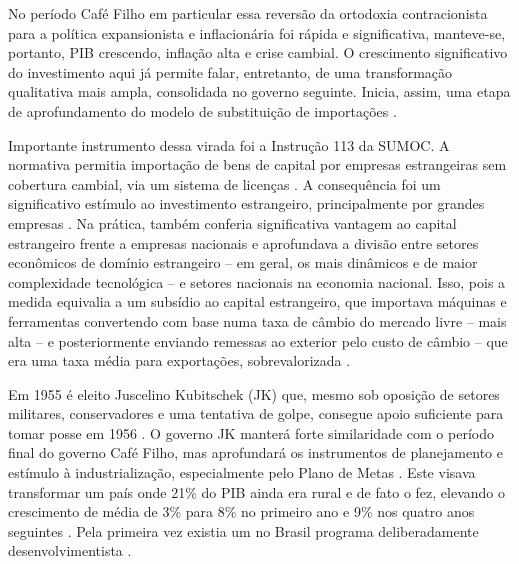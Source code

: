 No período Café Filho em particular essa reversão da ortodoxia contracionista
para a política expansionista e inflacionária foi rápida e
significativa, manteve-se, portanto, PIB crescendo, inflação alta e crise
cambial. O crescimento significativo do investimento aqui já permite
falar, entretanto, de uma transformação qualitativa mais ampla,
consolidada no governo seguinte. Inicia, assim, uma etapa de
aprofundamento do modelo de substituição de importações \citep{tavares_da_1973}.

Importante instrumento dessa virada foi a Instrução 113 da SUMOC. A
normativa permitia importação de bens de capital por empresas
estrangeiras sem cobertura cambial, via um sistema de licenças .
A consequência foi um significativo estímulo ao investimento
estrangeiro, principalmente por grandes empresas . Na prática,
também conferia significativa vantagem ao capital estrangeiro frente a
empresas nacionais e aprofundava a divisão entre setores econômicos de
domínio estrangeiro -- em geral, os mais dinâmicos e de maior
complexidade tecnológica -- e setores nacionais na economia nacional.
Isso, pois a medida equivalia a um subsídio ao capital estrangeiro, que
importava máquinas e ferramentas convertendo com base numa taxa de
câmbio do mercado livre -- mais alta -- e posteriormente enviando
remessas ao exterior pelo custo de câmbio -- que era uma taxa média para
exportações, sobrevalorizada \citep{caputomello2009}.

Em 1955 é eleito Juscelino Kubitschek (JK) que, mesmo sob oposição de
setores militares, conservadores e uma tentativa de golpe, consegue
apoio suficiente para tomar posse em 1956 \citep{fico_historia_2022}. O
governo JK manterá forte similaridade com o período final do governo
Café Filho, mas aprofundará os instrumentos de planejamento e estímulo à
industrialização, especialmente pelo Plano de Metas  . Este visava
transformar um país onde 21\% do PIB ainda era rural e de fato o fez,
elevando o crescimento de média de 3\% para 8\% no primeiro ano e 9\%
nos quatro anos seguintes \citep{villela_dos_2025}. Pela primeira vez existia um
no Brasil programa deliberadamente desenvolvimentista \citep{abreu2014}.

